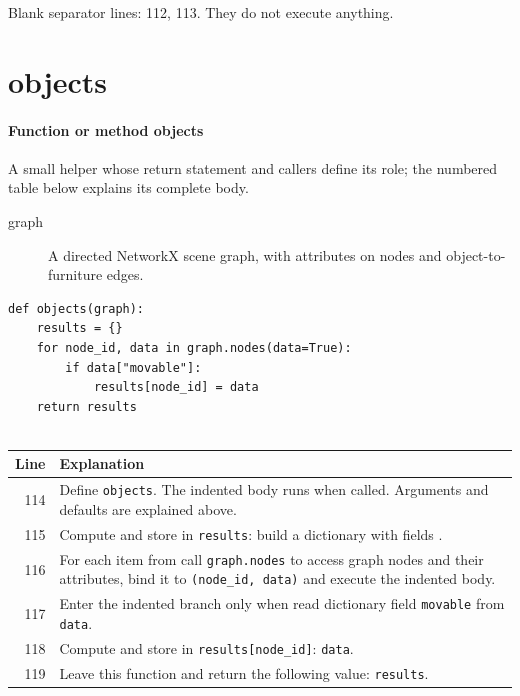 \documentclass[11pt,a4paper]{book}
\begin{document}
Blank separator lines: 112, 113. They do not execute anything.

\section{objects}

\paragraph{Function or method objects}
A small helper whose return statement and callers define its role; the numbered table below explains its complete body.

\begin{description}
\item[graph] A directed NetworkX scene graph, with attributes on nodes and object-to-furniture edges.
\end{description}

\begin{lstlisting}[firstnumber=114]
def objects(graph):
    results = {}
    for node_id, data in graph.nodes(data=True):
        if data["movable"]:
            results[node_id] = data
    return results


\end{lstlisting}

\begin{longtable}{r p{}}

\textbf{Line} & \textbf{Explanation} \\ \hline \endhead

114 & Define \texttt{objects}. The indented body runs when called. Arguments and defaults are explained above. \\

115 & Compute and store in \texttt{results}: build a dictionary with fields \texttt{}.  \\

116 & For each item from call \texttt{graph.nodes} to access graph nodes and their attributes, bind it to \texttt{(node\_id, data)} and execute the indented body. \\

117 & Enter the indented branch only when read dictionary field \texttt{movable} from \texttt{data}. \\

118 & Compute and store in \texttt{results[node\_id]}: \texttt{data}.  \\

119 & Leave this function and return the following value: \texttt{results}. \\

\end{longtable}
\end{document}

